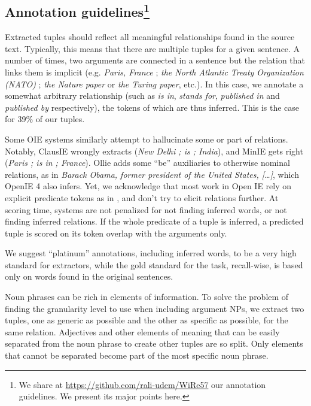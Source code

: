 \pdfoutput=1 \documentclass[11pt, a4paper]{article}
\begin{document}
\subsection{Annotation guidelines\footnote{We share at \url{https://github.com/rali-udem/WiRe57} our annotation guidelines. We present its major points here.}}
\label{sec:orgf2ac4e9}

Extracted tuples should reflect all meaningful relationships found in the
source text. Typically, this means that there are multiple tuples for a given
sentence. A number of times, two arguments are connected in a sentence but the
relation that links them is implicit (e.g. \emph{Paris, France} ; \emph{the North Atlantic
Treaty Organization (NATO)} ; \emph{the Nature paper} or \emph{the Turing paper},
etc.). In this case, we annotate a somewhat arbitrary relationship (such as \emph{is
in}, \emph{stands for}, \emph{published in} and \emph{published by} respectively), the tokens
of which are thus inferred. This is the case for 39\% of our tuples.

Some OIE systems similarly attempt to hallucinate some or part of relations.
Notably, ClausIE wrongly extracts (\emph{New Delhi ; is ; India}), and MinIE gets
right (\emph{Paris ; is in ; France}). Ollie adds some ``be'' auxiliaries to otherwise
nominal relations, as in \emph{Barack Obama, former president of the United States,
[\ldots{}]}, which OpenIE 4 also infers. Yet, we acknowledge that most work in Open
IE rely on explicit predicate tokens as in
\cite{mesquita-schmidek-barbosa:2013:EMNLP}, and don't try to elicit relations
further. At scoring time, systems are not penalized for not finding inferred
words, or not finding inferred relations. If the whole predicate of a tuple is inferred, a
predicted tuple is scored on its token overlap with the arguments only.

We suggest ``platinum'' annotations, including inferred words, to be a very high
standard for extractors, while the gold standard for the task, recall-wise, is
based only on words found in the original sentences.

Noun phrases can be rich in elements of information. To solve the problem
of finding the granularity level to use when including argument NPs, we
extract two tuples, one as generic as possible and the other as specific as
possible, for the same relation. Adjectives and other elements of meaning
that can be easily separated from the noun phrase to create other tuples
are so split. Only elements that cannot be separated become part of the most specific
noun phrase.
\end{document}
